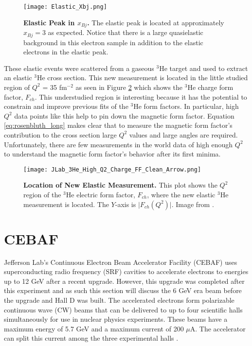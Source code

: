 \begin{figure}[!ht]
\begin{center}
\texttt{[image: Elastic\_Xbj.png]}
\end{center}
\caption[Elastic Peak in $x_{Bj}$]{
{\bf{Elastic Peak in $x_{Bj}$.}} The elastic peak is located at approximately $x_{Bj}=3$ as expected. Notice that there is a large quasielastic background in this electron sample in addition to the elastic electrons in the elastic peak.}
\label{fig:elastic_xbj}
\end{figure}

These elastic events were scattered from a gaseous $^3$He target and used to extract an elastic $^3$He cross section. This new measurement is located in the little studied region of $Q^2$ = 35 fm$^{-2}$ as seen in Figure \ref{fig:jlab_3he} which shows the $^3$He charge form factor, $F_{ch}$. This understudied region is interesting because it has the potential to constrain and improve previous fits of the $^3$He form factors. In particular, high $Q^2$ data points like this help to pin down the magnetic form factor. Equation \ref{eq:rosenbluth_long} makes clear that to measure the magnetic form factor's contribution to the cross section large $Q^2$ values and large angles are required. Unfortunately, there are few measurements in the world data of high enough $Q^2$ to understand the magnetic form factor's behavior after its first minima. 

\begin{figure}[!ht]
\begin{center}
\texttt{[image: JLab\_3He\_High\_Q2\_Charge\_FF\_Clean\_Arrow.png]}
\end{center}
\caption[Location of New Elastic Measurement]{
{\bf{Location of New Elastic Measurement.}} This plot shows the $Q^2$ region of the $^3$He electric form factor, $F_{ch}$, where the new elastic $^3$He measurement is located. The $Y$-axis is $\lvert {F_{ch}(Q^2)} \rvert$. Image from \cite{Article:Alex}.}
\label{fig:jlab_3he}
\end{figure}

\section{CEBAF}
\label{sec:CEBAF}

Jefferson Lab's Continuous Electron Beam Accelerator Facility (CEBAF) uses superconducting radio frequency (SRF) cavities to accelerate electrons to energies up to 12 GeV after a recent upgrade. However, this upgrade was completed after this experiment and as such this section will discuss the 6 GeV era beam before the upgrade and Hall D was built. The accelerated electrons form polarizable continuous wave (CW) beams that can be delivered to up to four scientific halls simultaneously for use in nuclear physics experiments. These beams have a maximum energy of 5.7 GeV and a maximum current of 200 $\mu$A. The accelerator can split this current among the three experimental halls \cite{Article:CEBAF}.

